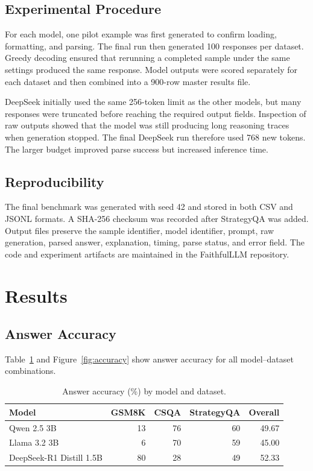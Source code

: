 \documentclass{article}
\begin{document}
\subsection{Experimental Procedure}

For each model, one pilot example was first generated to confirm loading, formatting, and parsing. The final run then generated 100 responses per dataset. Greedy decoding ensured that rerunning a completed sample under the same settings produced the same response. Model outputs were scored separately for each dataset and then combined into a 900-row master results file.

DeepSeek initially used the same 256-token limit as the other models, but many responses were truncated before reaching the required output fields. Inspection of raw outputs showed that the model was still producing long reasoning traces when generation stopped. The final DeepSeek run therefore used 768 new tokens. The larger budget improved parse success but increased inference time.

\subsection{Reproducibility}

The final benchmark was generated with seed 42 and stored in both CSV and JSONL formats. A SHA-256 checksum was recorded after StrategyQA was added. Output files preserve the sample identifier, model identifier, prompt, raw generation, parsed answer, explanation, timing, parse status, and error field. The code and experiment artifacts are maintained in the FaithfulLLM repository.

\section{Results}

\subsection{Answer Accuracy}

Table~\ref{tab:accuracy} and Figure~\ref{fig:accuracy} show answer accuracy for all model--dataset combinations.

\begin{table}[h]
\centering
\caption{Answer accuracy (\%) by model and dataset.}
\label{tab:accuracy}
\begin{tabular}{lrrrr}
\toprule
\textbf{Model} & \textbf{GSM8K} & \textbf{CSQA} & \textbf{StrategyQA} & \textbf{Overall} \\
\midrule
Qwen 2.5 3B & 13 & 76 & 60 & 49.67 \\
Llama 3.2 3B & 6 & 70 & 59 & 45.00 \\
DeepSeek-R1 Distill 1.5B & 80 & 28 & 49 & 52.33 \\
\bottomrule
\end{tabular}
\end{table}
\end{document}

